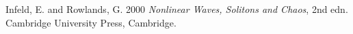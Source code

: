 \begin{thebibliography}{99}

Infeld, E. and Rowlands, G. 2000 \emph{Nonlinear Waves, Solitons and Chaos},
  2nd edn. Cambridge University Press, Cambridge.


\end{thebibliography}






